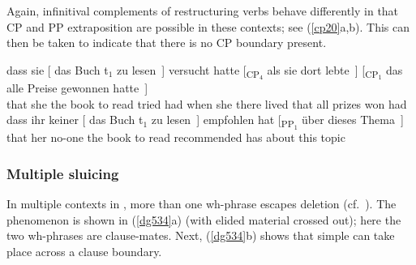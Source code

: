 \documentclass[output=paper]{langsci/langscibook}
\begin{document}
\ea\label{cp01} 
    \z
\z

Again, infinitival complements of restructuring verbs behave
differently in that CP and PP extraposition are possible in these
contexts; see (\ref{cp20}a,b). This can then be taken to indicate that there
is no CP boundary present.

\ea\label{cp20} 
    \ea \gll dass sie [ das Buch t$_1$ zu lesen~] versucht hatte [\textsubscript{CP$_4$} als sie dort lebte~] [\textsubscript{CP$_1$} das alle Preise gewonnen hatte~]\\
        that she\textsubscript{\Nom}  {} the book\textsubscript{\Acc} {} to read tried had {} when she there lived {} that all prizes\textsubscript{\Acc} won had\\
    \ex \gll dass ihr keiner [ das Buch t$_1$ zu lesen~] empfohlen hat [\textsubscript{PP$_1$} über dieses Thema~]\\
        that her\textsubscript{\Dat} no-one\textsubscript{\Nom} {} the book\textsubscript{\Acc} {} to read recommended has {} about this topic\\
    \z
\z

\subsubsection{\label{m4}Multiple sluicing}

In multiple  contexts in , more than one wh-phrase escapes
deletion (cf.\ \citealt{Merchant2001}). The phenomenon is shown in
(\ref{dg534}a) (with elided material crossed out); here the two wh-phrases are
clause-mates. Next, (\ref{dg534}b) shows that simple  can take place
across a clause boundary.
\end{document}
